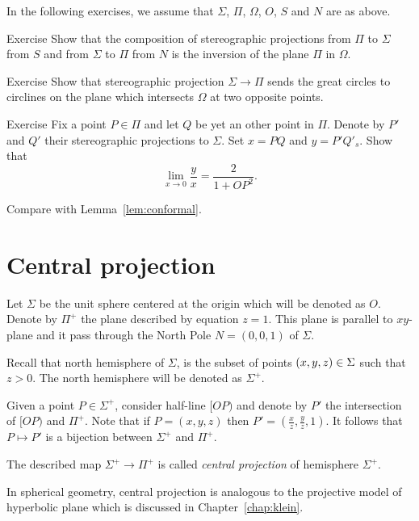 In the following exercises,
we assume that $\Sigma$, $\Pi$, $\Omega$, $O$, $S$ and $N$ are as above.
  
\begin{thm}{Exercise}\label{ex:two-stereographics}
Show that the composition of stereographic projections 
from $\Pi$ to $\Sigma$ from  $S$ and
from $\Sigma$ to $\Pi$ from  $N$ is 
the inversion of the plane $\Pi$ in $\Omega$.
\end{thm}

\begin{thm}{Exercise}\label{ex:great-circ}
Show that stereographic projection $\Sigma\to\Pi$
sends the great circles to circlines on the plane which intersects $\Omega$ at two opposite points.
\end{thm}

\begin{thm}{Exercise}\label{ex:conform-sphere}
Fix a point $P\in \Pi$  and let $Q$ be yet an other point in $\Pi$.
Denote by $P'$ and $Q'$ their stereographic projections to $\Sigma$.
Set $x=PQ$ and $y=P'Q'_s$.
Show that
$$\lim_{x\to 0} \frac{y}{x}=\frac{2}{1+OP^2}.$$

Compare with Lemma~\ref{lem:conformal}.
\end{thm}



\section*{Central projection}

Let $\Sigma$ be the unit sphere centered at the origin which will be denoted as $O$.
Denote by $\Pi^+$ the plane described by equation $z=1$.
This plane is parallel to $xy$-plane and it  pass through 
the North Pole $N=(0,0,1)$ of $\Sigma$.

Recall that north hemisphere of $\Sigma$,
is the subset of points $(x,y,z)\z\in \Sigma$ such that $z>0$.
The north hemisphere will be denoted as $\Sigma^+$.

Given a point $P\in \Sigma^+$, consider half-line $[OP)$ and denote by $P'$ the intersection of $[OP)$ and $\Pi^+$.
Note that if $P=(x,y,z)$ then $P'=(\tfrac xz,\tfrac yz,1)$.
It follows that $P\mapsto P'$ is a bijection between $\Sigma^+$ and $\Pi^+$.

The described map $\Sigma^+\to \Pi^+$ is called \emph{central projection} of hemisphere $\Sigma^+$.

In spherical geometry,
central projection is analogous to
the projective model of hyperbolic plane which is discussed in Chapter~\ref{chap:klein}.

